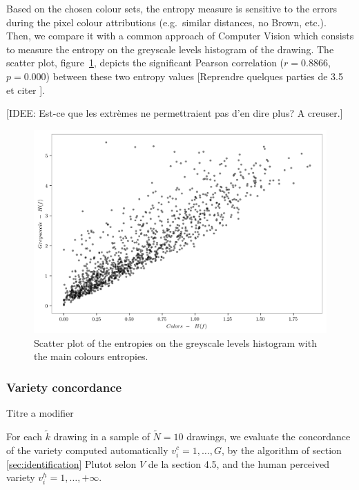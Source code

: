 \documentclass[11pt,a4paper]{article}
\begin{document}
Based on the chosen colour sets, the entropy measure is sensitive to the errors during the pixel colour attributions (e.g.~similar distances, no Brown, etc.). 
Then, we compare it with a common approach of Computer Vision which consists to measure the entropy on the greyscale levels histogram of the drawing. 
The scatter plot, figure~\ref{fig:entropies}, depicts the significant Pearson correlation ($r=0.8866$, $p=0.000$) between these two entropy values {\color{red}[Reprendre quelques parties de 3.5 et citer \citet{wu2013}]}. 

{\small \color{teal}[IDEE: Est-ce que les extr\`emes ne permettraient pas d'en dire plus? A creuser.]}

\begin{figure}[h!]
	\centering
	\includegraphics[width=\linewidth]{figures/colors-greysacale-entropies.png}
	\caption{Scatter plot of the entropies on the greyscale levels histogram with the main colours entropies.}
	\label{fig:entropies}
\end{figure}

\subsubsection{Variety concordance} {\color{red} Titre a modifier}
\label{sec:results_variety_concordance}

For each $\tilde{k}$ drawing in a sample of $\tilde{N} = 10$ drawings, we evaluate the concordance of the variety computed automatically $v^c_i = {1, \dots, G}$, by the algorithm of section \ref{sec:identification} {\color{red} Plutot selon $V$ de la section 4.5}, and the human perceived variety $v^h_i = {1, \dots, +\infty}$. 
\end{document}
